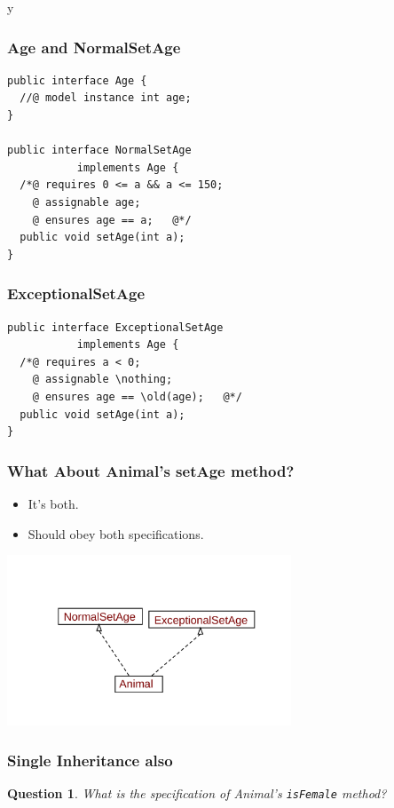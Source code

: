 \if y\MAKEHANDOUTS \documentclass[t,compress,landscape,handout]{beamer}
\newtheorem*{question}{Question}
\begin{document}
\begin{frame}[fragile]
\frametitle{Age and NormalSetAge}
\begin{lstlisting}
public interface Age {
  //@ model instance int age;
}

public interface NormalSetAge 
           implements Age {
  /*@ requires 0 <= a && a <= 150;
    @ assignable age;
    @ ensures age == a;   @*/
  public void setAge(int a);
}
\end{lstlisting}
\end{frame}

\begin{frame}[fragile]
\frametitle{ExceptionalSetAge}
\begin{lstlisting}
public interface ExceptionalSetAge
           implements Age {
  /*@ requires a < 0;
    @ assignable \nothing;
    @ ensures age == \old(age);   @*/
  public void setAge(int a);
}
\end{lstlisting}
\end{frame}

\begin{frame}
\frametitle{What About Animal's setAge method?}

\begin{itemize}
\item
It's both.

\item
Should \alert{obey both specifications}.
\end{itemize}
\includegraphics[height=2in]{multiple-inh2}
\end{frame}

\begin{frame}[fragile]
\frametitle{Single Inheritance also}
\begin{question}
What is the specification of Animal's \texttt{isFemale} method?

\rm



\end{question}
\end{frame}
\end{document}

